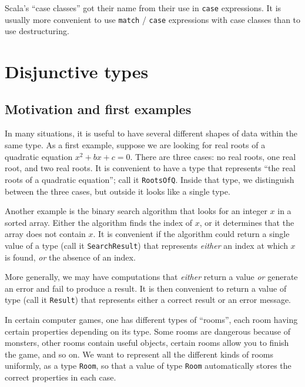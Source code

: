 Scala\textsf{'}s \textsf{``}case classes\textsf{''} got their name from their use in \lstinline!case!
expressions. It is usually more convenient to use \lstinline!match!
/ \lstinline!case! expressions with case classes than to use destructuring.

\section{Disjunctive types}

\subsection{Motivation and first examples\label{subsec:Disjunctive-Motivation-and-first-examples}}

In many situations, it is useful to have several different shapes
of data within the same type. As a first example, suppose we are looking
for real roots of a quadratic equation $x^{2}+bx+c=0$. There are
three cases: no real roots, one real root, and two real roots. It
is convenient to have a type that represents \textsf{``}the real roots of
a quadratic equation\textsf{''}; call it \lstinline!RootsOfQ!. Inside that
type, we distinguish between the three cases, but outside it looks
like a single type.

Another example is the binary search algorithm that looks for an integer
$x$ in a sorted array. Either the algorithm finds the index of $x$,
or it determines that the array does not contain $x$. It is convenient
if the algorithm could return a single value of a type (call it \lstinline!SearchResult!)
that represents \emph{either} an index at which $x$ is found, \emph{or}
the absence of an index.

More generally, we may have computations that \emph{either} return
a value \emph{or} generate an error and fail to produce a result.
It is then convenient to return a value of type (call it \lstinline!Result!)
that represents either a correct result or an error message. 

In certain computer games, one has different types of \textsf{``}rooms\textsf{''},
each room having certain properties depending on its type. Some rooms
are dangerous because of monsters, other rooms contain useful objects,
certain rooms allow you to finish the game, and so on. We want to
represent all the different kinds of rooms uniformly, as a type \lstinline!Room!,
so that a value of type \lstinline!Room! automatically stores the
correct properties in each case.

